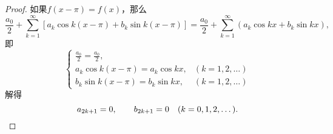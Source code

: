 \begin{example}
\begin{proof}
如果\(f(x-\pi) = f(x)\)，那么\begin{equation*}
	\frac{a_0}{2} + \sum_{k=1}^\infty \left[
		a_k \cos k(x-\pi)
		+ b_k \sin k(x-\pi)
	\right]
	=
	\frac{a_0}{2} + \sum_{k=1}^\infty \left(
		a_k \cos kx
		+ b_k \sin kx
	\right),
\end{equation*}
即\begin{equation*}
	\left\{ \begin{array}{ll}
		\frac{a_0}{2} = \frac{a_0}{2}, \\
		a_k \cos k(x-\pi) = a_k \cos kx, &(k=1,2,\dotsc) \\
		b_k \sin k(x-\pi) = b_k \sin kx, &(k=1,2,\dotsc)
	\end{array} \right.
\end{equation*}
解得\begin{equation*}
	a_{2k+1} = 0, \qquad
	b_{2k+1} = 0
	\quad(k=0,1,2,\dotsc).
	\qedhere
\end{equation*}
\end{proof}
\end{example}
